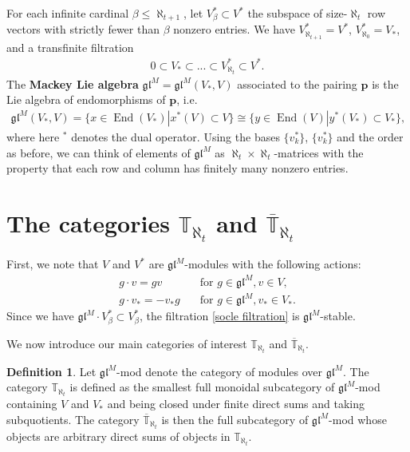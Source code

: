 \documentclass[openany, a4paper]{amsbook}
\theoremstyle{definition}
\newtheorem{defn}[thm]{Definition}
\numberwithin{equation}{chapter}
\newcommand{\Tbar}[1]{\overline{\mathbb{T}}_{\aleph_{#1}}}
\newcommand{\T}[1]{{\mathbb{T}}_{\aleph_{#1}}}
\DeclareMathOperator{\End}{\mathrm{End}}
\begin{document}
For each infinite cardinal $\beta \leq \aleph_{t+1}$, let $V^\ast_{\beta} \subset V^\ast$ the subspace of size-$\aleph_t$ row vectors with strictly fewer than $\beta$ nonzero entries. We have $V^{\ast}_{\aleph_{t+1}} = V^{\ast}$, $V^{\ast}_{\aleph_0} = V_{\ast}$, and a transfinite filtration 
\begin{align}\label{socle filtration}
    0 \subset V_{\ast} \subset ... \subset V^{\ast}_{\aleph_{t}} \subset V^{\ast}.
\end{align}
The \textbf{Mackey Lie algebra} $\mathfrak{gl}^M = \mathfrak{gl}^M (V_\ast, V)$ associated to the pairing $\mathbf{p}$ is the Lie algebra of endomorphisms of $\mathbf{p}$, i.e.
\begin{align}
    \mathfrak{gl}^M (V_\ast, V) = \{ x \in \End(V_\ast) | x^\ast(V) \subset V \} \cong \{ y \in \End(V) | y^\ast(V_\ast) \subset V_\ast \},
\end{align}
where here $^\ast$ denotes the dual operator. Using the bases $\{v^{\ast}_{k} \}$, $\{v^{\ast}_{k} \}$ and the order as before, we can think of elements of $\mathfrak{gl}^M$ as $\aleph_t \times \aleph_t$-matrices with the property that each row and column has finitely many nonzero entries. 


\section{The categories \texorpdfstring{$\T{t}$}{T t} and  \texorpdfstring{$\Tbar{t}$}{T bar t}}\label{sec: category T and T bar}

First, we note that $V$ and $V^\ast$ are $\mathfrak{gl}^M$-modules with the following actions:
\begin{align*}
    g \cdot v = gv \quad & \text{for } g \in \mathfrak{gl}^M, v \in V, \\
    g \cdot v_{\ast} = -v_\ast g \quad &\text{for } g \in \mathfrak{gl}^M, v_\ast \in V_\ast.
\end{align*}
Since we have $\mathfrak{gl}^M \cdot V^{\ast}_{\beta} \subset  V^{\ast}_{\beta}$, the filtration \eqref{socle filtration} is  $\mathfrak{gl}^M$-stable. 

We now introduce our main categories of interest $\T{t}$ and $\Tbar{t}$.

\begin{defn}
    Let $\mathfrak{gl}^M$-mod denote the category of modules over $\mathfrak{gl}^M$. The category $\T{t}$ is defined as the smallest full monoidal subcategory of $\mathfrak{gl}^M$-mod containing $V$ and $V_\ast$ and being closed under finite direct sums and taking subquotients. The category $\Tbar{t}$ is then the full subcategory of $\mathfrak{gl}^M$-mod whose objects are arbitrary direct sums of objects in $\T{t}$.
\end{defn}
\end{document}
